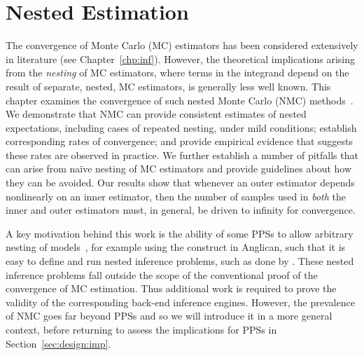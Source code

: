 
\chapter{Nested Estimation}
\label{chp:nest}

The convergence of Monte Carlo (MC) estimators has been considered extensively in 
literature (see Chapter~\ref{chp:inf}).  However, the theoretical implications
arising from the \emph{nesting} of MC estimators, where terms in the integrand depend on the
result of separate, nested, MC estimators, is generally less well known.
This chapter examines the convergence of such nested Monte Carlo (NMC) 
methods~\citep{rainforth2016pitfalls,rainforth2017pitfalls}.
We demonstrate that NMC can provide consistent estimates of 
nested expectations, including cases of repeated nesting, under mild conditions;
establish corresponding rates of convergence;
and provide empirical evidence that suggests these rates are observed in practice.
We further establish a number of pitfalls that can arise from na\"{i}ve nesting of MC estimators
and provide guidelines about how they can be avoided.
Our results show that whenever an outer estimator depends nonlinearly on an inner
estimator, then the number of samples used in \emph{both} the inner and outer estimators
must, in general, be driven to infinity for convergence.  

A key motivation behind this work is the ability of some PPSs to allow
arbitrary nesting of models~\cite{mantadelis2011nesting,stuhlmuller2014reasoning}, for example using
 the \conditional construct in Anglican,
such that it is easy to define and run nested inference problems, such as done
by \citep{ouyang2016practical,le2016nested}. These nested inference problems fall outside the
scope of the conventional proof of the convergence of MC estimation. Thus additional
work is required to prove the validity of the corresponding back-end inference engines.
However, the prevalence of NMC goes far beyond PPSs and so we will introduce it in
a more general context, before returning to assess the implications for PPSs in Section~\ref{sec:design:imp}.









%
%


